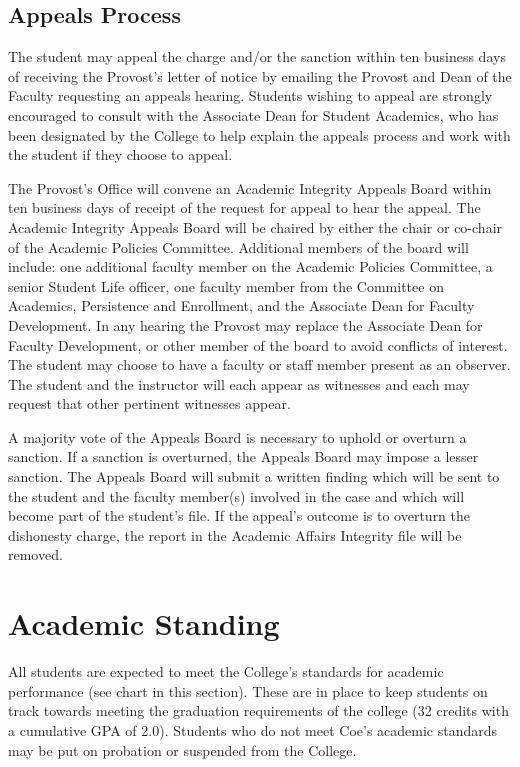 \documentclass[
  letterpaper,
]{scrbook}
\begin{document}
\subsection{Appeals Process}\label{appeals-process}

The student may appeal the charge and/or the sanction within ten
business days of receiving the Provost's letter of notice by emailing
the Provost and Dean of the Faculty requesting an appeals hearing.
Students wishing to appeal are strongly encouraged to consult with the
Associate Dean for Student Academics, who has been designated by the
College to help explain the appeals process and work with the student if
they choose to appeal.

The Provost's Office will convene an Academic Integrity Appeals Board
within ten business days of receipt of the request for appeal to hear
the appeal. The Academic Integrity Appeals Board will be chaired by
either the chair or co-chair of the Academic Policies Committee.
Additional members of the board will include: one additional faculty
member on the Academic Policies Committee, a senior Student Life
officer, one faculty member from the Committee on Academics, Persistence
and Enrollment, and the Associate Dean for Faculty Development. In any
hearing the Provost may replace the Associate Dean for Faculty
Development, or other member of the board to avoid conflicts of
interest. The student may choose to have a faculty or staff member
present as an observer. The student and the instructor will each appear
as witnesses and each may request that other pertinent witnesses appear.

A majority vote of the Appeals Board is necessary to uphold or overturn
a sanction. If a sanction is overturned, the Appeals Board may impose a
lesser sanction. The Appeals Board will submit a written finding which
will be sent to the student and the faculty member(s) involved in the
case and which will become part of the student's file. If the appeal's
outcome is to overturn the dishonesty charge, the report in the Academic
Affairs Integrity file will be removed.

\section{Academic Standing}\label{academic-standing}

All students are expected to meet the College's standards for academic
performance (see chart in this section). These are in place to keep
students on track towards meeting the graduation requirements of the
college (32 credits with a cumulative GPA of 2.0). Students who do not
meet Coe's academic standards may be put on probation or suspended from
the College.
\end{document}
